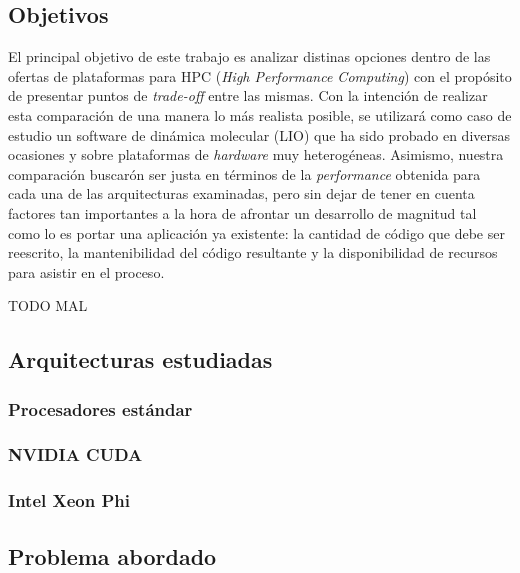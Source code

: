 \subsection{Objetivos}

El principal objetivo de este trabajo es analizar distinas opciones dentro de
las ofertas de plataformas para HPC (\textit{High Performance Computing}) con
el prop\'osito de presentar puntos de \textit{trade-off} entre las mismas. Con la
intenci\'on de realizar esta comparaci\'on de una manera lo m\'as realista posible,
se utilizar\'a como caso de estudio un software de din\'amica molecular (LIO) que
ha sido probado en diversas ocasiones y sobre plataformas de \textit{hardware}
muy heterogéneas. Asimismo, nuestra comparaci\'on buscar\'on ser justa en t\'erminos
de la \textit{performance} obtenida para cada una de las arquitecturas
examinadas, pero sin dejar de tener en cuenta factores tan importantes a la
hora de afrontar un desarrollo de magnitud tal como lo es portar una
aplicación ya existente: la cantidad de c\'odigo que debe ser reescrito, la
mantenibilidad del c\'odigo resultante y la disponibilidad de recursos para
asistir en el proceso.

TODO MAL

\subsection{Arquitecturas estudiadas}

\subsubsection{Procesadores est\'andar}



\subsubsection{NVIDIA CUDA}



\subsubsection{Intel Xeon Phi}



\subsection{Problema abordado}


